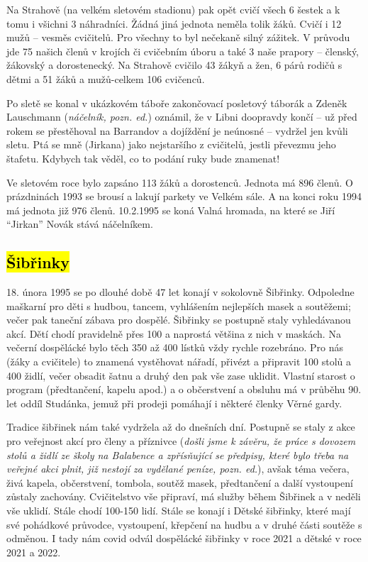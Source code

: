 Na Strahově (na velkém sletovém stadionu) pak opět cvičí všech 6 šestek
a k tomu i všichni 3 náhradníci. Žádná jiná jednota neměla tolik žáků.
Cvičí i 12 mužů -- vesměs cvičitelů. Pro všechny to byl nečekaně silný
zážitek. V průvodu jde 75 našich členů v krojích či cvičebním úboru a
také 3 naše prapory -- členský, žákovský a dorostenecký. Na Strahově
cvičilo 43 žákyň a žen, 6 párů rodičů s dětmi a 51 žáků a mužů-celkem
106 cvičenců.

Po sletě se konal v ukázkovém táboře zakončovací posletový táborák a
Zdeněk Lauschmann (\emph{náčelník, pozn. ed.}) oznámil, že v Libni
doopravdy končí -- už před rokem se přestěhoval na Barrandov a dojíždění
je neúnosné -- vydržel jen kvůli sletu. Ptá se mně (Jirkana) jako
nejstaršího z cvičitelů, jestli převezmu jeho štafetu. Kdybych tak
věděl, co to podání ruky bude znamenat!

Ve sletovém roce bylo zapsáno 113 žáků a dorostenců. Jednota má 896
členů. O prázdninách 1993 se brousí a lakují parkety ve Velkém sále. A
na konci roku 1994 má jednota již 976 členů. 10.2.1995 se koná Valná
hromada, na které se Jiří ``Jirkan'' Novák stává náčelníkem.

\subsection{\texorpdfstring{\hl{Šibřinky}}{Šibřinky}}\label{ux161ibux159inky}

18. února 1995 se po dlouhé době 47 let konají v sokolovně Šibřinky.
Odpoledne maškarní pro děti s hudbou, tancem, vyhlášením nejlepších
masek a soutěžemi; večer pak taneční zábava pro dospělé. Šibřinky se
postupně staly vyhledávanou akcí. Dětí chodí pravidelně přes 100 a
naprostá většina z nich v maskách. Na večerní dospělácké bylo těch 350
až 400 lístků vždy rychle rozebráno. Pro nás (žáky a cvičitele) to
znamená vystěhovat nářadí, přivézt a připravit 100 stolů a 400 židlí,
večer obsadit šatnu a druhý den pak vše zase uklidit. Vlastní starost o
program (předtančení, kapelu apod.) a o občerstvení a obsluhu má v
průběhu 90. let oddíl Studánka, jemuž při prodeji pomáhají i některé
členky Věrné gardy.

Tradice šibřinek nám také vydržela až do dnešních dní. Postupně se staly
z akce pro veřejnost akcí pro členy a příznivce (\emph{došli jsme k
závěru, že práce s dovozem stolů a židlí ze školy na Balabence a
zpřísňující se předpisy, které bylo třeba na veřejné akci plnit, již
nestojí za vydělané peníze, pozn. ed.}), avšak téma večera, živá kapela,
občerstvení, tombola, soutěž masek, předtančení a další vystoupení
zůstaly zachovány. Cvičitelstvo vše připraví, má služby během Šibřinek a
v neděli vše uklidí. Stále chodí 100-150 lidí. Stále se konají i Dětské
šibřinky, které mají své pohádkové průvodce, vystoupení, křepčení na
hudbu a v druhé části soutěže s odměnou. I tady nám covid odvál
dospělácké šibřinky v roce 2021 a dětské v roce 2021 a 2022.

